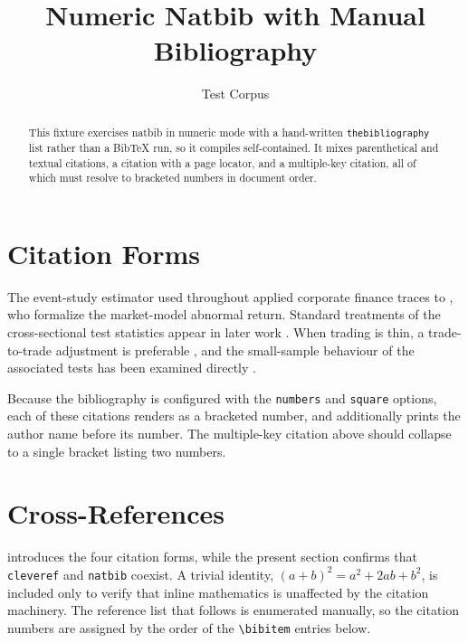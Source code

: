 \documentclass[11pt]{article}
\title{Numeric Natbib with Manual Bibliography}
\author{Test Corpus}
\date{}
\begin{document}
\maketitle

\begin{abstract}
This fixture exercises natbib in numeric mode with a hand-written
\texttt{thebibliography} list rather than a BibTeX run, so it compiles
self-contained. It mixes parenthetical and textual citations, a citation with a
page locator, and a multiple-key citation, all of which must resolve to bracketed
numbers in document order.
\end{abstract}

\section{Citation Forms}
\label{sec:forms}

The event-study estimator used throughout applied corporate finance traces to
\citet{brown1985using}, who formalize the market-model abnormal return. Standard
treatments of the cross-sectional test statistics appear in later work
\citep{campbell1997econometrics}. When trading is thin, a trade-to-trade
adjustment is preferable \citep[p.~5]{maynesrumsey1993}, and the small-sample
behaviour of the associated tests has been examined directly
\citep{kolari2010event,corrado1992nonparametric}.

Because the bibliography is configured with the \texttt{numbers} and
\texttt{square} options, each of these citations renders as a bracketed number,
and \citet{brown1985using} additionally prints the author name before its number.
The multiple-key citation above should collapse to a single bracket listing two
numbers.

\section{Cross-References}
\label{sec:xref}

 introduces the four citation forms, while the present section
confirms that \texttt{cleveref} and \texttt{natbib} coexist. A trivial
identity, $(a+b)^2 = a^2 + 2ab + b^2$, is included only to verify that inline
mathematics is unaffected by the citation machinery. The reference list that
follows is enumerated manually, so the citation numbers are assigned by the order
of the \verb|\bibitem| entries below.
\end{document}
